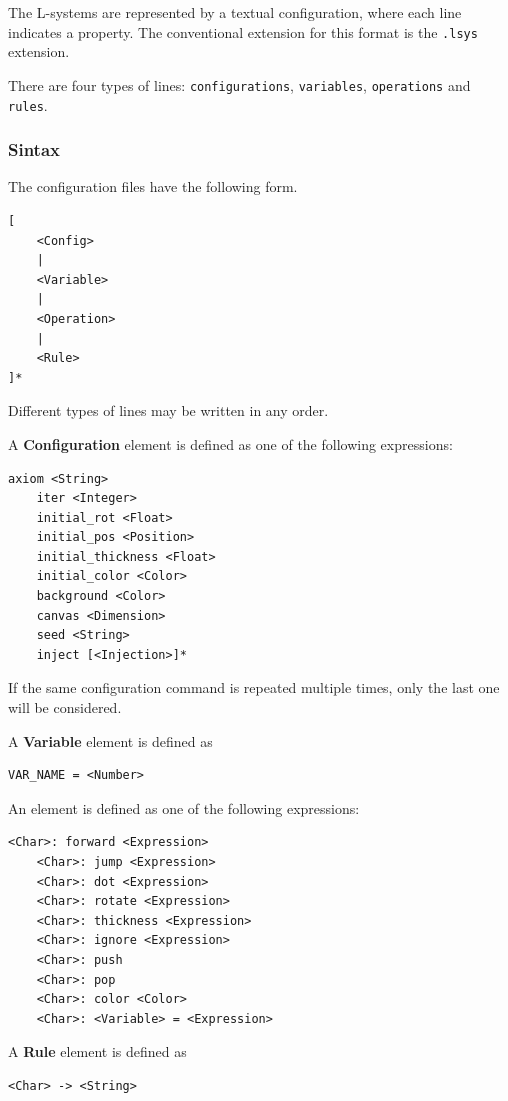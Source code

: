 \documentclass[a4paper]{article}
\begin{document}
The L-systems are represented by a textual configuration,
where each line indicates a property.
The conventional extension for this format is the \texttt{.lsys} extension.

There are four types of lines: 
\texttt{configurations},
\texttt{variables}, \texttt{operations} and \texttt{rules}.

\subsubsection{Sintax}

The configuration files have the following form.

\begin{lstlisting}[style=boxed]
[
    <Config>
    |
    <Variable>
    |
    <Operation>
    |
    <Rule>
]*
\end{lstlisting}

Different types of lines may be written in any order.

A \textbf{Configuration} element is defined as one of the following expressions:
\begin{lstlisting}[style=boxed]
    axiom <String>
    iter <Integer>
    initial_rot <Float>
    initial_pos <Position>
    initial_thickness <Float>
    initial_color <Color>
    background <Color>
    canvas <Dimension>
    seed <String>
    inject [<Injection>]*
\end{lstlisting}
If the same configuration command is repeated multiple times,
only the last one will be considered.

A \textbf{Variable} element is defined as
\begin{lstlisting}[style=boxed]
    VAR_NAME = <Number>
\end{lstlisting}

An  element is defined as one of the following expressions:
\begin{lstlisting}[style=boxed]
    <Char>: forward <Expression>
    <Char>: jump <Expression>
    <Char>: dot <Expression>
    <Char>: rotate <Expression>
    <Char>: thickness <Expression>
    <Char>: ignore <Expression>
    <Char>: push
    <Char>: pop
    <Char>: color <Color>
    <Char>: <Variable> = <Expression>
\end{lstlisting}

A \textbf{Rule} element is defined as
\begin{lstlisting}[style=boxed]
    <Char> -> <String>
\end{lstlisting}
\end{document}
